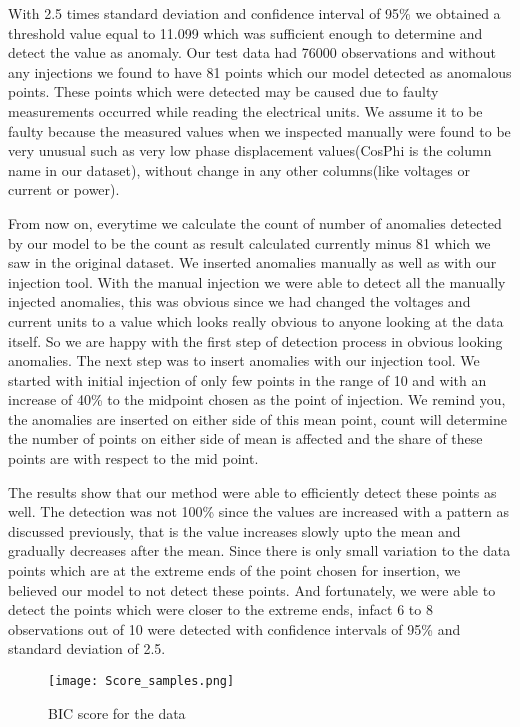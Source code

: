\begin{enumerate}
\begin{itemize}
With 2.5 times standard deviation and confidence interval of 95\% we obtained a threshold value equal to 11.099 which was sufficient enough to determine and detect the value as anomaly. Our test data had 76000 observations and without any injections we found to have 81 points which our model detected as anomalous points. These points which were detected may be caused due to faulty measurements occurred while reading the electrical units. We assume it to be faulty because the measured values when we inspected manually were found to be very unusual such as very low phase displacement values(CosPhi is the column name in our dataset), without change in any other columns(like voltages or current or power).

From now on, everytime we calculate the count of number of anomalies detected by our model to be the count as result calculated currently minus 81 which we saw in the original dataset. We inserted anomalies manually as well as with our injection tool. With the manual injection we were able to detect all the manually injected anomalies, this was obvious since we had changed the voltages and current units to a value which looks really obvious to anyone looking at the data itself. So we are happy with the first step of detection process in obvious looking anomalies. The next step was to insert anomalies with our injection tool. We started with initial injection of only few points in the range of 10 and with an increase of  40\% to the midpoint chosen as the point of injection. We remind you, the anomalies are inserted on either side of this mean point, count will determine the number of points on either side of mean is affected and the share of these points are with respect to the mid point.

The results show that our method were able to efficiently detect these points as well. The detection was not 100\% since the values are increased with a pattern as discussed previously, that is the value increases slowly upto the mean and gradually decreases after the mean. Since there is only small variation to the data points which are at the extreme ends of the point chosen for insertion, we believed our model to not detect these points. And fortunately, we were able to detect the points which were closer to the extreme ends, infact 6 to 8 observations out of 10 were detected with confidence intervals of 95\% and standard deviation of 2.5. 
\begin{figure}
\centerline{\texttt{[image: Score\_samples.png]}}
    \caption{BIC score for the data}
    \label{fig:ss}
\end{figure}

\end{itemize}

\end{enumerate}

\label{sec:Eval}